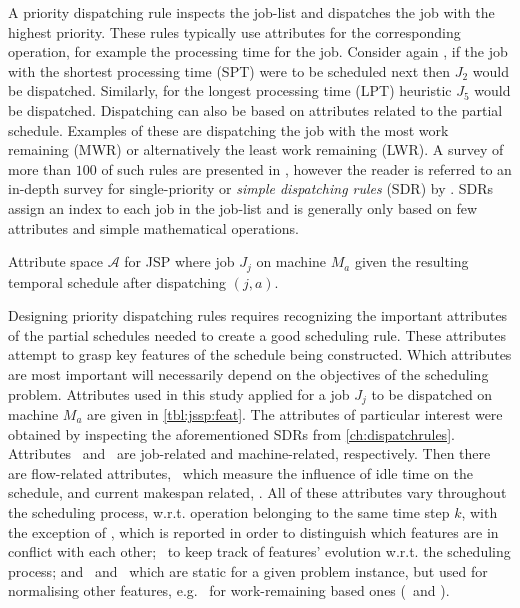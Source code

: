 \documentclass[smallextended]{svjour3}
\begin{document}
A priority dispatching rule  inspects the job-list
 and dispatches the job with the highest priority. These
rules typically use attributes for the corresponding operation, for example the 
processing time for the job. Consider again , if the
job with the shortest processing time (SPT) were to be scheduled next
then $J_2$ would be dispatched. Similarly, for the longest processing
time (LPT) heuristic $J_5$ would be dispatched. Dispatching can
also be based on attributes related to the partial schedule. Examples of these are 
dispatching the job with the most work remaining (MWR) or alternatively the least work remaining
(LWR). A survey of more than
$100$ of such rules are presented in \citet{Panwalkar77}, however the
reader is referred to an in-depth survey for single-priority or
\emph{simple dispatching rules} (SDR) by \citet{Haupt89}.  SDRs assign
an index to each job in the job-list and
is generally only based on few attributes and simple mathematical
operations.

\begin{table}[t!] \centering
  \caption[Attribute space $\mathcal{A}$ for JPS]{Attribute space $\mathcal{A}$ for JSP where job $J_j$ on machine $M_a$ given the resulting temporal schedule after dispatching $(j,a)$.
  }
  \label{tbl:jssp:feat}
  
\end{table}
	
Designing priority dispatching rules requires recognizing the
important attributes of the partial schedules needed to create a good
scheduling rule. These attributes attempt to grasp key features of the schedule being
constructed. Which attributes are most important will necessarily depend on the
objectives of the scheduling problem. 
 Attributes used in this study applied for a job $J_j$ to
be dispatched on machine $M_a$ are given in \cref{tbl:jssp:feat}.
The attributes of particular interest were obtained by inspecting the
aforementioned SDRs from \cref{ch:dispatchrules}. Attributes \phiJobRelated\ and
\phiMacRelated\ are job-related and machine-related, respectively.
Then there are flow-related attributes, \phiFlowRelated\, which measure the influence of idle
time on the schedule, and current makespan related, \phiScheduleRelated.
All of these attributes vary throughout the scheduling process,
w.r.t. operation belonging to the same time step $k$, with the exception of
\phimac, which is reported in order to distinguish which features are
in conflict with each other;
 \phistep\ to keep track of features'
evolution w.r.t. the scheduling process; and \phitotalProc\ and
\phiwrmTotal\ which are static for a given problem instance, but used
for normalising other features, e.g. \phiwrmTotal\ for work-remaining
based ones (\phiwrmJob\ and \phiwrmMac).
\end{document}
